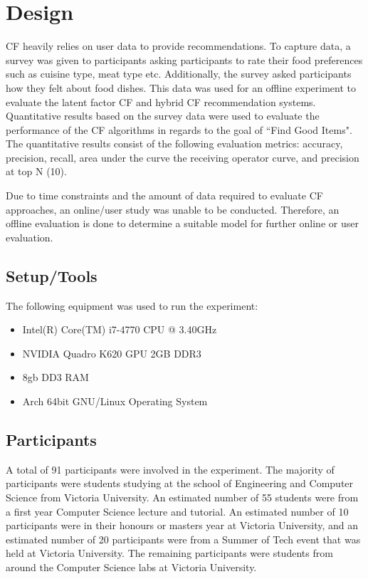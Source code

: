 \section{Design}

 CF heavily relies on user data to provide recommendations. To capture data, a survey was given to participants asking participants to rate their food preferences such as cuisine type, meat type etc. Additionally, the survey asked participants how they felt about food dishes. This data was used for an offline experiment to evaluate the latent factor CF and hybrid CF recommendation systems.  Quantitative results based on the survey data were used to evaluate the performance of the CF algorithms in regards to the goal of ``Find Good Items". The quantitative results consist of the following evaluation metrics: accuracy, precision, recall, area under the curve the receiving operator curve, and precision at top N (10). 


Due to time constraints and the amount of data required to evaluate CF approaches, an online/user study was unable to be conducted. Therefore, an offline evaluation is done to determine a suitable model for further online or user evaluation. 


\subsection{Setup/Tools}
The following equipment was used to run the experiment:
\begin{itemize}
	\item{Intel(R) Core(TM) i7-4770 CPU @ 3.40GHz}
	\item{NVIDIA Quadro K620 GPU 2GB DDR3}
	\item{8gb DD3 RAM}
	\item{Arch 64bit GNU/Linux Operating System}
\end{itemize}

\subsection{Participants}

A total of 91 participants were involved in the experiment. The majority of participants were students studying at the school of Engineering and Computer Science from Victoria University. An estimated number of 55 students were from a first year Computer Science lecture and tutorial. An estimated number of 10 participants were in their honours or masters year at Victoria University, and an estimated number of 20 participants were from a Summer of Tech event that was held at Victoria University. The remaining participants were students from around the Computer Science labs at Victoria University.

